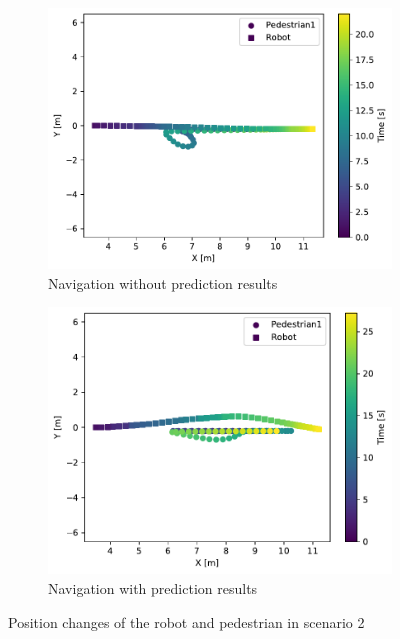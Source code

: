 \begin{figure}[H]
  \centering
  \begin{subfigure}{0.8\textwidth}
    \centering
    \includegraphics[keepaspectratio, scale=0.75]{images/block_normal.pdf}
    \caption{Navigation without prediction results}
    \label{Fig:block-normal}
  \end{subfigure}
  \vfill
  \begin{subfigure}{0.8\textwidth}
    \centering
    \includegraphics[keepaspectratio, scale=0.75]{images/block_pred.pdf}
    \caption{Navigation with prediction results}
    \label{Fig:block-pred}
  \end{subfigure}
  \caption{Position changes of the robot and pedestrian in scenario 2}
  \label{Fig:block-viz}
\end{figure}